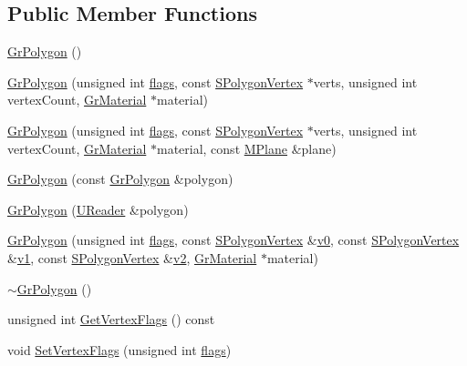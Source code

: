 \begin{CompactItemize}
\subsection*{Public Member Functions}
\begin{CompactItemize}
\item 
\hyperlink{class_gr_polygon_128cdb94a468adfdae5b6fbf00a038f5}{GrPolygon} ()
\item 
\hyperlink{class_gr_polygon_8d47174424c6d59868900ca0a8707df2}{GrPolygon} (unsigned int \hyperlink{_u_t_message_8h_0a3c0b351ab09281b662a9ff4f900a53}{flags}, const \hyperlink{struct_s_polygon_vertex}{SPolygonVertex} $\ast$verts, unsigned int vertexCount, \hyperlink{class_gr_material}{GrMaterial} $\ast$material)
\item 
\hyperlink{class_gr_polygon_96d02ce6472ab3c9f0432a1bf5b20080}{GrPolygon} (unsigned int \hyperlink{_u_t_message_8h_0a3c0b351ab09281b662a9ff4f900a53}{flags}, const \hyperlink{struct_s_polygon_vertex}{SPolygonVertex} $\ast$verts, unsigned int vertexCount, \hyperlink{class_gr_material}{GrMaterial} $\ast$material, const \hyperlink{class_m_plane}{MPlane} \&plane)
\item 
\hyperlink{class_gr_polygon_1af2b8f57b49002d6918ebc9ccb97a86}{GrPolygon} (const \hyperlink{class_gr_polygon}{GrPolygon} \&polygon)
\item 
\hyperlink{class_gr_polygon_17a0c25129aef4a4b9da2a7190cc0a52}{GrPolygon} (\hyperlink{class_u_reader}{UReader} \&polygon)
\item 
\hyperlink{class_gr_polygon_ea7e55bfc699301c5c65b5f63cf17bc0}{GrPolygon} (unsigned int \hyperlink{_u_t_message_8h_0a3c0b351ab09281b662a9ff4f900a53}{flags}, const \hyperlink{struct_s_polygon_vertex}{SPolygonVertex} \&\hyperlink{glext__bak_8h_8f5597b6002609ead33af221dcf29790}{v0}, const \hyperlink{struct_s_polygon_vertex}{SPolygonVertex} \&\hyperlink{glext__bak_8h_435c176a02c061b43e19bdf7c86cceae}{v1}, const \hyperlink{struct_s_polygon_vertex}{SPolygonVertex} \&\hyperlink{glext__bak_8h_0928f6d0f0f794ba000a21dfae422136}{v2}, \hyperlink{class_gr_material}{GrMaterial} $\ast$material)
\item 
\hyperlink{class_gr_polygon_f97e8da5717982c01a838b9a48897a71}{$\sim$GrPolygon} ()
\item 
unsigned int \hyperlink{class_gr_polygon_d5cb84031e18ea044c44cb7e245b7fc2}{GetVertexFlags} () const 
\item 
void \hyperlink{class_gr_polygon_b710c1e840a9047a2288813fc005974d}{SetVertexFlags} (unsigned int \hyperlink{_u_t_message_8h_0a3c0b351ab09281b662a9ff4f900a53}{flags})

\end{CompactItemize}
\end{CompactItemize}
